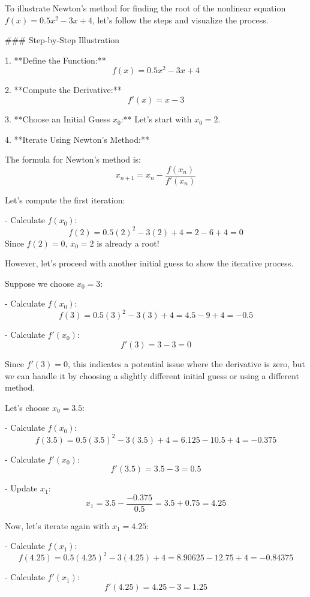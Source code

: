 To illustrate Newton's method for finding the root of the nonlinear equation \( f(x) = 0.5x^2 - 3x + 4 \), let's follow the steps and visualize the process.

### Step-by-Step Illustration

1. **Define the Function:**
   \[
   f(x) = 0.5x^2 - 3x + 4
   \]

2. **Compute the Derivative:**
   \[
   f'(x) = x - 3
   \]

3. **Choose an Initial Guess \( x_0 \):**
   Let's start with \( x_0 = 2 \).

4. **Iterate Using Newton's Method:**

   The formula for Newton's method is:
   \[
   x_{n+1} = x_n - \frac{f(x_n)}{f'(x_n)}
   \]

   Let's compute the first iteration:

   - Calculate \( f(x_0) \):
     \[
     f(2) = 0.5(2)^2 - 3(2) + 4 = 2 - 6 + 4 = 0
     \]
     Since \( f(2) = 0 \), \( x_0 = 2 \) is already a root!

   However, let's proceed with another initial guess to show the iterative process.

   Suppose we choose \( x_0 = 3 \):

   - Calculate \( f(x_0) \):
     \[
     f(3) = 0.5(3)^2 - 3(3) + 4 = 4.5 - 9 + 4 = -0.5
     \]

   - Calculate \( f'(x_0) \):
     \[
     f'(3) = 3 - 3 = 0
     \]

   Since \( f'(3) = 0 \), this indicates a potential issue where the derivative is zero, but we can handle it by choosing a slightly different initial guess or using a different method.

   Let's choose \( x_0 = 3.5 \):

   - Calculate \( f(x_0) \):
     \[
     f(3.5) = 0.5(3.5)^2 - 3(3.5) + 4 = 6.125 - 10.5 + 4 = -0.375
     \]

   - Calculate \( f'(x_0) \):
     \[
     f'(3.5) = 3.5 - 3 = 0.5
     \]

   - Update \( x_1 \):
     \[
     x_1 = 3.5 - \frac{-0.375}{0.5} = 3.5 + 0.75 = 4.25
     \]

   Now, let's iterate again with \( x_1 = 4.25 \):

   - Calculate \( f(x_1) \):
     \[
     f(4.25) = 0.5(4.25)^2 - 3(4.25) + 4 = 8.90625 - 12.75 + 4 = -0.84375
     \]

   - Calculate \( f'(x_1) \):
     \[
     f'(4.25) = 4.25 - 3 = 1.25
     \]

